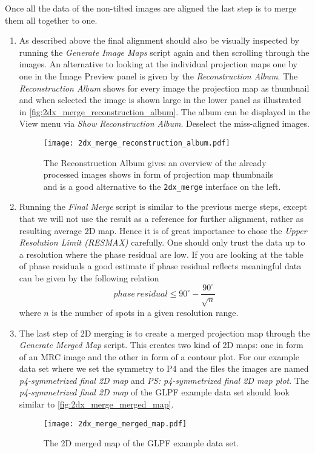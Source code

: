 Once all the data of the non-tilted images are aligned the last step is to merge them all together to one.
\begin{enumerate}
	\item As described above the final alignment should also be visually inspected by running the \textit{Generate Image Maps} script again and then scrolling through the images. An alternative to looking at the individual projection maps one by one in the  Image Preview panel is given by the \textit{Reconstruction Album}. The \textit{Reconstruction Album} shows for every image the projection map as thumbnail and when selected the image is shown large in the lower panel as illustrated in \autoref{fig:2dx_merge_reconstruction_album}. The album can be displayed in the View menu via \textit{Show Reconstruction Album}. Deselect the miss-aligned images.
	
	\begin{figure}[H]
		\centering
		\texttt{[image: 2dx\_merge\_reconstruction\_album.pdf]}
		\caption{The Reconstruction Album gives an overview of the already processed images shows in form of projection map thumbnails and is a good alternative to the \texttt{2dx\_merge} interface on the left.}
		\label{fig:2dx_merge_reconstruction_album}
	\end{figure}
	
	\item Running the \textit{Final Merge} script is similar to the previous merge steps, except that we will not use the result as a reference for further alignment, rather as resulting average 2D map. Hence it is of great importance to chose the \textit{Upper Resolution Limit (RESMAX)} carefully. One should only trust the data up to a resolution where the phase residual are low. If you are looking at the table of phase residuals a good estimate if phase residual reflects meaningful data can be given by the following relation
	\begin{equation}
		phase\,residual \leq 90^{\circ} - \dfrac{90^{\circ}}{\sqrt{n}}
	\end{equation}
	where $n$ is the number of spots in a given resolution range.
	\item The last step of 2D merging is to create a merged projection map through the \textit{Generate Merged Map} script. This creates two kind of 2D maps: one in form of an MRC image and the other in form of a contour plot. For our example data set where we set the symmetry to P4 and the files the images are named \textit{p4-symmetrized final 2D map} and \textit{PS: p4-symmetrized final 2D map plot}. The \textit{p4-symmetrized final 2D map} of the GLPF example data set should look similar to \autoref{fig:2dx_merge_merged_map}.
	
		\begin{figure}[H]
		\centering
		\texttt{[image: 2dx\_merge\_merged\_map.pdf]}
		\caption{The 2D merged map of the GLPF example data set.}
		\label{fig:2dx_merge_merged_map}
	\end{figure}
	
\end{enumerate} 



